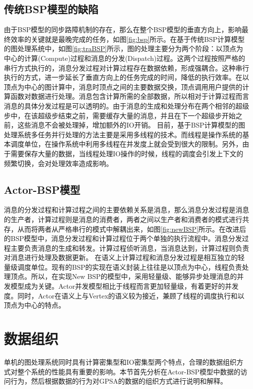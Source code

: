 \subsection{传统BSP模型的缺陷}
由于BSP模型的同步路障机制的存在，那么在整个BSP模型的垂直方向上，影响最终效率的关键就是最晚完成的任务，如图\ref{fig:bsp}所示。在基于传统BSP计算模型的图处理系统中，如图\ref{fig:traBSP}所示，图的处理主要分为两个阶段：以顶点为中心的计算(Compute)过程和消息的分发(Dispatch)过程。这两个过程按照严格的串行方式执行的，消息分发过程对计算过程存在数据依赖，形成强耦合。这种串行执行的方式，进一步延长了垂直方向上的任务完成的时间，降低的执行效率。在以顶点为中心的图计算中，消息时顶点之间的主要数据交换，顶点调用用户提供的计算函数对数据进行处理。消息包含计算所需的全部数据，所以相对于计算过程而言消息的具体分发过程是可以透明的。由于消息的生成和处理分布在两个相邻的超级步中，在该超级步结束之前，需要缓存大量的消息，并且在下一个超级步开始之前，这些消息不会被处理掉，增加额外的IO开销。
目前，基于BSP计算模型的图处理系统多任务并行处理的方法主要是采用多线程的技术。而线程是操作系统的基本调度单位，在操作系统中利用多线程在并发度上就会受到很大的限制。另外，由于需要保存大量的数据，当线程处理IO操作的时候，线程的调度会引发上下文的频繁切换，会对处理效率造成影响。

\subsection{Actor-BSP模型}

消息的分发过程和计算过程之间的主要依赖关系是消息，那么消息分发过程是消息的生产者，计算过程则是消息的消费者，两者之间以生产者和消费者的模式进行共存，从而将两者从严格串行的模式中解耦出来，如图\ref{fig:newBSP}所示。在改进后的BSP模型中，消息分发过程和计算过程位于两个单独的执行流程中。消息分发过程主要负责消息的生成和转发。计算过程侦听消息，当消息达到，计算过程则负责对消息进行处理及数据更新。
在语义上计算过程和消息分发过程是相互独立的轻量级调度单位。现有的BSP的实现在语义封装上往往是以顶点为中心，线程负责处理顶点。所以，在实现New BSP的模型中，采用轻量级、能够异步处理消息的并发模型成为关键。Actor并发模型相比于线程而言更加轻量级，有着更好的并发度。同时，Actor在语义上与Vertex的语义较为接近，兼顾了线程的调度执行和以顶点为中心的特点。



\section{数据组织}

单机的图处理系统同时具有计算密集型和IO密集型两个特点，合理的数据组织方式对整个系统的性能具有重要的影响。本节首先分析在Actor-BSP模型中数据的访问行为，然后根据数据的行为对GPSA的数据的组织方式进行说明和解释。

